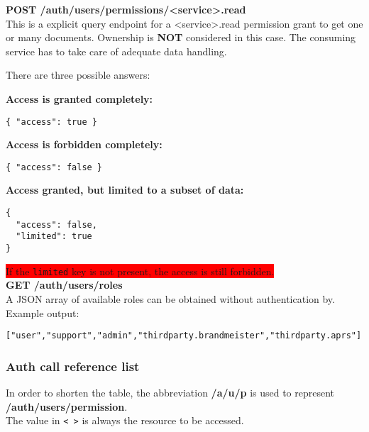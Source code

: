 \textbf{POST /auth/users/permissions/<service>.read}\\
This is a explicit query endpoint for a <service>.read permission grant to get one or many documents. Ownership is \textbf{NOT} considered in this case. The consuming service has to take care of adequate data handling.


There are three possible answers:

\textbf{Access is granted completely:}
\begin{lstlisting}
{ "access": true }
\end{lstlisting}

\textbf{Access is forbidden completely:}
\begin{lstlisting}
{ "access": false }
\end{lstlisting}

\textbf{Access granted, but limited to a subset of data:}
\begin{lstlisting}
{
  "access": false,
  "limited": true
}
\end{lstlisting}

\colorbox{red}{If the \texttt{limited} key is not present, the access is still forbidden.}\\

\textbf{GET /auth/users/roles}\\
A JSON array of available roles can be obtained without authentication by.\\
Example output:
\begin{lstlisting}
["user","support","admin","thirdparty.brandmeister","thirdparty.aprs"]
\end{lstlisting}

\newpage
\subsubsection{Auth call reference list}
In order to shorten the table, the abbreviation \textbf{/a/u/p} is used to represent\\
\textbf{/auth/users/permission}.\\

The value in \verb|< >| is always the resource to be accessed.\\

